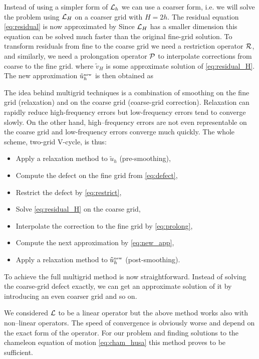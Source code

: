 Instead of using a simpler form of $\mathcal{L}_h$ we can use a coarser form, i.e. we will solve the problem using $\mathcal{L}_H$ on a coarser grid with $H=2h$. The residual equation \eqref{eq:residual} is now approximated by
Since $\mathcal{L}_H$ has a smaller dimension this equation can be solved much faster than the original fine-grid solution. To transform residuals from fine to the coarse grid we need a restriction operator $\mathcal{R}$, and similarly, we need a  prolongation operator $\mathcal{P}$ to interpolate corrections from coarse to the fine grid.
where $\tilde v_H$ is some approximate solution of \eqref{eq:residual_H}. The new approximation $\tilde u_h^\text{\tiny new}$ is then obtained as

The idea behind multigrid techniques is a combination of smoothing on the fine grid (relaxation) and on the coarse grid (coarse-grid correction). Relaxation can rapidly reduce high-frequency errors but low-frequency errors tend to converge slowly. On the other hand, high--frequency errors are not even representable on the coarse grid and low-frequency errors converge much quickly. The whole scheme, two-grid V-cycle, is thus:
\begin{itemize}
    \item Apply a relaxation method to $\tilde u_h$ (pre-smoothing),
    \item Compute the defect on the fine grid from \eqref{eq:defect},
    \item Restrict the defect by \eqref{eq:restrict},
    \item Solve \eqref{eq:residual_H} on the coarse grid,
    \item Interpolate the correction to the fine grid by \eqref{eq:prolong},
    \item Compute the next approximation by \eqref{eq:new_app},
    \item Apply a relaxation method to $\tilde u_h^\text{\tiny new}$ (post-smoothing).
\end{itemize}
To achieve the full multigrid method is now straightforward. Instead of solving the coarse-grid defect exactly, we can get an approximate solution of it by introducing an even coarser grid and so on.

We considered $\mathcal{L}$ to be a linear operator but the above method works also with non--linear operators. The speed of convergence is obviously worse and depend on the exact form of the operator. For our problem and finding solutions to the chameleon equation of motion \eqref{eq:cham_husa} this method proves to be sufficient.


